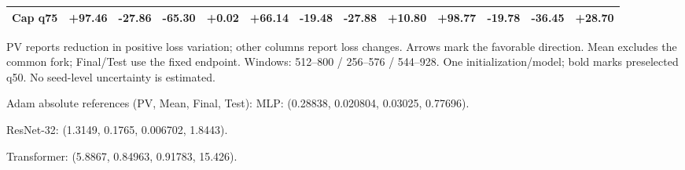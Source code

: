 \begin{table}[!t]
\begin{tabular}{lrrrrrrrrrrrr}
Cap q75 & +97.46 & -27.86 & -65.30 & +0.02 & +66.14 & -19.48 & -27.88 & +10.80 & +98.77 & -19.78 & -36.45 & +28.70 \\
\bottomrule
\end{tabular}
\par\vspace{3pt}\begin{minipage}{\textwidth}\fontsize{9}{10.5}\selectfont
PV reports reduction in positive loss variation; other columns report loss changes. Arrows mark the favorable direction. Mean excludes the common fork; Final/Test use the fixed endpoint. Windows: 512--800 / 256--576 / 544--928. One initialization/model; bold marks preselected q50. No seed-level uncertainty is estimated.\par
Adam absolute references (PV, Mean, Final, Test):
MLP: (0.28838, 0.020804, 0.03025, 0.77696).\par
ResNet-32: (1.3149, 0.1765, 0.006702, 1.8443).\par
Transformer: (5.8867, 0.84963, 0.91783, 15.426).\par
\end{minipage}
\end{table}
